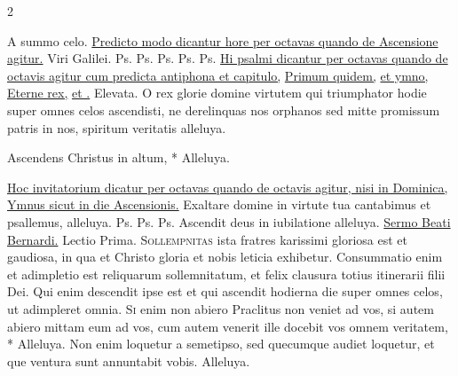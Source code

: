 \begin{multicols*}{2}
\begin{responsory-breve}
\end{responsory-breve}%
\newline \V A summo celo.
\newline \ul{Predicto modo dicantur hore per octavas quando de Ascensione agitur.}
 Viri Galilei. {\color{Red} Ps.}  {\color{Red} Ps.}  {\color{Red} Ps.}  {\color{Red} Ps.}  {\color{Red} Ps.}  \ul{Hi psalmi dicantur per octavas quando de octavis agitur cum predicta antiphona et capitulo,} \hyperlink{primum-quidem-capitulum}{Primum quidem,} \ul{et ymno,} \hyperlink{eterne-rex-altissime}{Eterne rex,} \ul{et \Vbar .} Elevata.
 O rex glorie domine virtutem qui triumphator hodie super omnes celos ascendisti, ne derelinquas nos orphanos sed mitte promissum patris in nos, spiritum veritatis alleluya.
\begin{invitatory}
{Ascendens Christus in altum, * Alleluya.}
\end{invitatory}
\newline \ul{Hoc invitatorium dicatur per octavas quando de octavis agitur, nisi in Dominica, Ymnus sicut in die Ascensionis.}
 Exaltare domine in virtute tua cantabimus et psallemus, alleluya. {\color{Red} Ps.}  {\color{Red} Ps.}  {\color{Red} Ps.}  \V Ascendit deus in iubilatione alleluya.
\newline \ul{Sermo Beati Bernardi.} {\color{Red} Lectio Prima. \grecross}
\lettrine[lines=2]{\zallmancaps \color{Red} S}{ollempnitas} ista fratres karissimi gloriosa est et gaudiosa, in qua et Christo gloria et nobis leticia exhibetur. Consummatio enim et adimpletio est reliquarum sollemnitatum, et felix clausura totius itinerarii filii Dei. Qui enim descendit ipse est et qui ascendit hodierna die super omnes celos, ut adimpleret omnia.
\lettrine[lines=2]{\zallmancaps \color{Blue} S}{i} \hypertarget{si-enim-non}{\label{si-enim-non}} enim non abiero Praclitus non veniet ad vos, si autem abiero mittam eum ad vos, cum autem venerit ille docebit vos omnem veritatem, * Alleluya. \V Non enim loquetur a semetipso, sed quecumque audiet loquetur, et que ventura sunt annuntabit vobis. Alleluya.

\end{multicols*}
